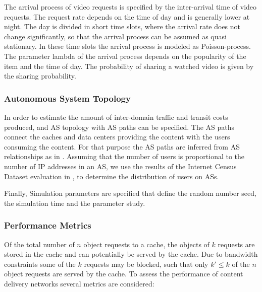 The arrival process of video requests is specified by the inter-arrival time of video requests.
The request rate depends on the time of day and is generally lower at night.
The day is divided in short time slots, where the arrival rate does not change significantly, so that the arrival process can be assumed as quasi stationary.
In these time slots the arrival process is modeled as Poisson-process.
The parameter lambda of the arrival process depends on the popularity of the item and the time of day.
The probability of sharing a watched video is given by the sharing probability.

\subsubsection{Autonomous System Topology}
In order to estimate the amount of inter-domain traffic and transit costs produced, and AS topology with AS paths can be specified.
The AS paths connect the caches and data centers providing the content with the users consuming the content.
For that purpose the AS paths are inferred from AS relationships as in .
Assuming that the number of users is proportional to the number of IP addresses in an AS, we use the results of the Internet Census Dataset evaluation in , to determine the distribution of users on ASs.

Finally, Simulation parameters are specified that define the random number seed, the simulation time and the parameter study.

\subsubsection{Performance Metrics}

Of the total number of $n$ object requests to a cache, the objects of $k$ requests are stored in the cache and can potentially be served by the cache.
Due to bandwidth constraints some of the $k$ requests may be blocked, such that only $k'\leq k$ of the $n$ object requests are served by the cache.
To assess the performance of content delivery networks several metrics are considered:

